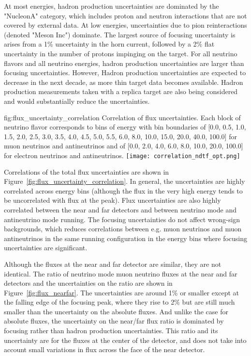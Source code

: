 At most energies, hadron production uncertainties are dominated by the "NucleonA" category, which includes proton and neutron interactions that are not covered by external data.  At low energies, uncertainties due to pion reinteractions (denoted "Meson Inc") dominate.   The largest source of focusing uncertainty is arises from a 1\% uncertainty in the horn current, followed by a 2\% flat uncertainty in the number of protons impinging on the target.   For all neutrino flavors and all neutrino energies, hadron production uncertainties are larger than focusing uncertainties.  However, Hadron production uncertainties are expected to decrease in the next decade, as more thin target data becomes available.  Hadron production measurements taken with a replica target are also being considered and would substantially reduce the uncertainties.  


\begin{dunefigure}{fig:flux_uncertainty_correlation}
{Correlation of flux uncertainties.  Each block of neutrino flavor corresponds to bins of energy with bin boundaries of [0.0, 0.5, 1.0, 1.5, 2.0, 2.5, 3.0, 3.5, 4.0, 4.5, 5.0, 5.5, 6.0, 8.0, 10.0, 15.0, 20.0, 40.0, 100.0] for muon neutrinos and antineutrinos and of [0.0, 2.0, 4.0, 6.0, 8.0, 10.0, 20.0, 100.0] for electron neutrinos and antineutrinos. }
    \texttt{[image: correlation\_ndtf\_opt.png]}\end{dunefigure}

Correlations of the total flux uncertainties are shown in Figure~\ref{fig:flux_uncertainty_correlation}.  In general, the uncertainties are highly correlated across energy bins (although the flux in the very high energy tends to be uncorrelated with flux at the peak).  Flux uncertainties are also highly correlated between the near and far detectors and between neutrino mode and antineutrino mode running.  The focusing uncertainties do not affect wrong-sign backgrounds, which reduces correlations between e.g. muon neutrinos and muon antineutrinos in the same running configuration in the energy bins where focusing uncertainties are significant.    

Although the fluxes at the near and far detector are similar, they are not identical.  The ratio of neutrino mode muon neutrino fluxes at the near and far detectors and the uncertainties on the ratio are shown in  Figure~\ref{fig:flux_nearfar}.  The uncertainties are around 1\% or smaller except at the falling edge of the focusing peak, where they rise to 2\% but are still much smaller than the uncertainty on the absolute fluxes.    And unlike the case for absolute fluxes, the uncertainty on the near/far flux ratio is dominated by focusing rather than hadron production uncertainties.  This ratio and its uncertainty are for the fluxes at the center of the detector, and does not take into account small variations in flux across the face of the near detector.     

